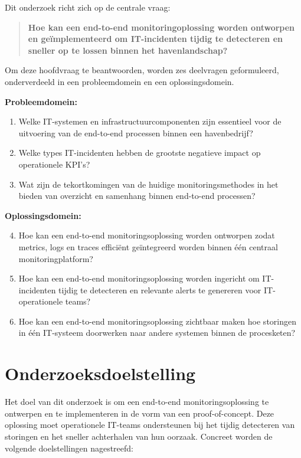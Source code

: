 Dit onderzoek richt zich op de centrale vraag:

\begin{quote}
    \textbf{Hoe kan een end-to-end monitoringoplossing worden ontworpen en geïmplementeerd om IT-incidenten tijdig te detecteren en sneller op te lossen binnen het havenlandschap?}
\end{quote}

Om deze hoofdvraag te beantwoorden, worden zes deelvragen geformuleerd, onderverdeeld in een probleemdomein en een oplossingsdomein.

\textbf{Probleemdomein:}

\begin{enumerate}
    \item Welke IT-systemen en infrastructuurcomponenten zijn essentieel voor de uitvoering van de end-to-end processen binnen een havenbedrijf?
    \item Welke types IT-incidenten hebben de grootste negatieve impact op operationele KPI's?
    \item Wat zijn de tekortkomingen van de huidige monitoringsmethodes in het bieden van overzicht en samenhang binnen end-to-end processen?
\end{enumerate}

\textbf{Oplossingsdomein:}

\begin{enumerate}
    \setcounter{enumi}{3}
    \item Hoe kan een end-to-end monitoringsoplossing worden ontworpen zodat metrics, logs en traces efficiënt geïntegreerd worden binnen één centraal monitoringplatform?
    \item Hoe kan een end-to-end monitoringsoplossing worden ingericht om IT-incidenten tijdig te detecteren en relevante alerts te genereren voor IT-operationele teams?
    \item Hoe kan een end-to-end monitoringsoplossing zichtbaar maken hoe storingen in één IT-systeem doorwerken naar andere systemen binnen de procesketen?
\end{enumerate}

\section{Onderzoeksdoelstelling}

Het doel van dit onderzoek is om een end-to-end monitoringsoplossing te ontwerpen en te implementeren in de vorm van een proof-of-concept. Deze oplossing moet operationele IT-teams ondersteunen bij het tijdig detecteren van storingen en het sneller achterhalen van hun oorzaak. Concreet worden de volgende doelstellingen nagestreefd:

